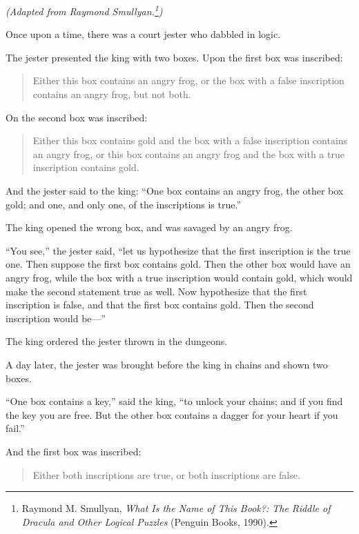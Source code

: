 {

{
 \textit{(Adapted from Raymond
Smullyan.}\textit{\footnote{Raymond M. Smullyan, \textit{What Is the Name of This Book?:
The Riddle of Dracula and Other Logical Puzzles} (Penguin Books,
1990).}}\textit{)} }


 Once upon a time, there was a court jester who dabbled in logic.


 The jester presented the king with two boxes. Upon the first box
was inscribed:

\begin{quote}
{
 Either this box contains an angry frog, or the box with a false
 inscription contains an angry frog, but not both.}
\end{quote}


 On the second box was inscribed:

\begin{quote}
{
 Either this box contains gold and the box with a false inscription
contains an angry frog, or this box contains an angry frog and the box
with a true inscription contains gold.}
\end{quote}


 And the jester said to the king: ``One box
contains an angry frog, the other box gold; and one, and only one, of
the inscriptions is true.''


 The king opened the wrong box, and was savaged by an angry frog.


 ``You see,'' the jester said,
``let us hypothesize that the first inscription is the
true one. Then suppose the first box contains gold. Then the other box
would have an angry frog, while the box with a true inscription would
contain gold, which would make the second statement true as well. Now
hypothesize that the first inscription is false, and that the first box
contains gold. Then the second inscription would
be---''


 The king ordered the jester thrown in the dungeons.


 A day later, the jester was brought before the king in chains and
shown two boxes.


 ``One box contains a key,''
said the king, ``to unlock your chains; and if you
find the key you are free. But the other box contains a dagger for your
heart if you fail.''


 And the first box was inscribed:

\begin{quote}
{
 Either both inscriptions are true, or both inscriptions are
 false.}
\end{quote}


}
